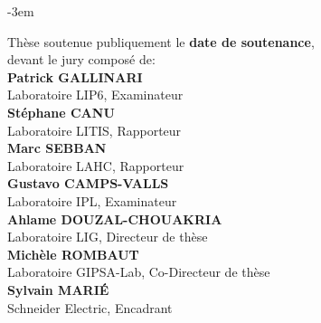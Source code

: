 \begin{titlepage}
\begin{adjustwidth}{}{-3em}
\begin{flushleft}
\begin{flushright}
\begin{minipage}{\leftshift}
\begin{flushleft}
{Thèse soutenue publiquement le \textbf{date de soutenance},\\ devant le jury composé de:}\\[\espvert]
{\textbf{Patrick GALLINARI}}\\
{Laboratoire LIP6, Examinateur }\\ %
{\textbf{Stéphane CANU}}\\
{Laboratoire LITIS, Rapporteur}\\
{\textbf{Marc SEBBAN}}\\
{Laboratoire LAHC, Rapporteur}\\
{\textbf{Gustavo CAMPS-VALLS}}\\
{Laboratoire IPL, Examinateur}\\
{\textbf{Ahlame DOUZAL-CHOUAKRIA}}\\
{Laboratoire LIG, Directeur de thèse}\\
{\textbf{Michèle ROMBAUT}}\\
{Laboratoire GIPSA-Lab, Co-Directeur de thèse}\\
{\textbf{Sylvain MARI\'{E}}}\\
{Schneider Electric, Encadrant}\\

\end{flushleft}
\end{minipage}
\end{flushright}
\vfill
\end{flushleft}
\end{adjustwidth}
\end{titlepage}
\setlength{\parskip}{10pt}
\endgroup

\cleardoublepage

